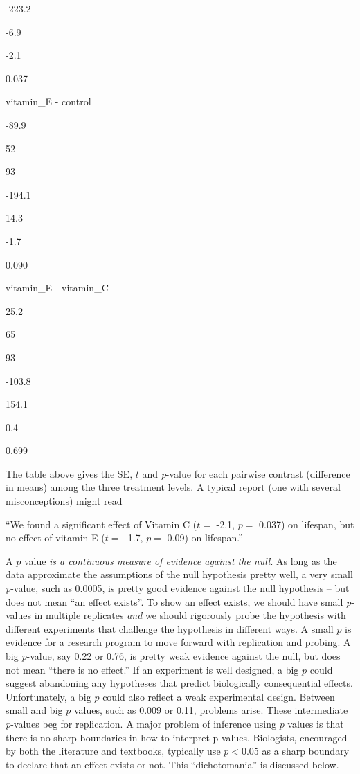 \documentclass[]{book}
\begin{document}
-223.2

-6.9

-2.1

0.037

vitamin\_E - control

-89.9

52

93

-194.1

14.3

-1.7

0.090

vitamin\_E - vitamin\_C

25.2

65

93

-103.8

154.1

0.4

0.699

The table above gives the SE, \(t\) and \emph{p}-value for each pairwise
contrast (difference in means) among the three treatment levels. A
typical report (one with several misconceptions) might read

``We found a significant effect of Vitamin C (\(t=\) -2.1, \(p=\) 0.037)
on lifespan, but no effect of vitamin E (\(t=\) -1.7, \(p=\) 0.09) on
lifespan.''

A \(p\) value \emph{is a continuous measure of evidence against the
null}. As long as the data approximate the assumptions of the null
hypothesis pretty well, a very small \emph{p}-value, such as 0.0005, is
pretty good evidence against the null hypothesis -- but does not mean
``an effect exists''. To show an effect exists, we should have small
\emph{p}-values in multiple replicates \emph{and} we should rigorously
probe the hypothesis with different experiments that challenge the
hypothesis in different ways. A small \(p\) is evidence for a research
program to move forward with replication and probing. A big
\emph{p}-value, say 0.22 or 0.76, is pretty weak evidence against the
null, but does not mean ``there is no effect.'' If an experiment is well
designed, a big \(p\) could suggest abandoning any hypotheses that
predict biologically consequential effects. Unfortunately, a big \(p\)
could also reflect a weak experimental design. Between small and big
\(p\) values, such as 0.009 or 0.11, problems arise. These intermediate
\emph{p}-values beg for replication. A major problem of inference using
\(p\) values is that there is no sharp boundaries in how to interpret
p-values. Biologists, encouraged by both the literature and textbooks,
typically use \(p < 0.05\) as a sharp boundary to declare that an effect
exists or not. This ``dichotomania'' is discussed below.
\end{document}
